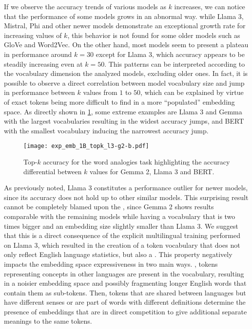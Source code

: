 If we observe the accuracy trends of various models as $k$ increases, we can notice that the performance of some models grows in an abnormal way.
 while Llama 3, Mistral, Phi and other newer models demonstrate an exceptional growth rate for increasing values of $k$, this behavior is not found for some older models such as GloVe and Word2Vec.
On the other hand, most models seem to present a plateau in performance around $k = 30$ except for Llama 3, which accuracy appears to be steadily increasing even at $k = 50$.
This patterns can be interpreted according to the vocabulary dimension the analyzed models, excluding older ones.
In fact, it is possible to observe a direct correlation between model vocabulary size and jump in performance between $k$ values from $1$ to $50$, which can be explained by virtue of exact tokens being more difficult to find in a more ``populated'' embedding space.
As directly shown in \cref{fig:exp_emb_1_B}, some extreme examples are Llama 3 and Gemma with the largest vocabularies resulting in the widest accuracy jumps, and BERT with the smallest vocabulary inducing the narrowest accuracy jump.

\begin{figure}[t!]
    \centering
    \texttt{[image: exp\_emb\_1B\_topk\_l3-g2-b.pdf]}
    \caption{Top-$k$ accuracy for the word analogies task highlighting the accuracy differential between $k$ values for Gemma 2, Llama 3 and BERT.}
    \label{fig:exp_emb_1_B}
\end{figure}

As previously noted, Llama 3 constitutes a performance outlier for newer models, since its accuracy does not hold up to other similar models.
This surprising result cannot be completely blamed upon the , since Gemma 2 shows results comparable with the remaining models while having a vocabulary that is two times bigger and an embedding size slightly smaller than Llama 3.
We suggest that this is a direct consequence of the explicit multilingual training performed on Llama 3, which resulted in the creation of a token vocabulary that does not only reflect English language statistics, but also a .
This property negatively impacts the embedding space expressiveness in two main ways.
, tokens representing concepts in other languages are present in the vocabulary, resulting in a noisier embedding space and possibly fragmenting longer English words that contain them as sub-tokens.
Then, tokens that are shared between languages but have different senses or are part of words with different definitions determine the presence of embeddings that are in direct competition to give additional separate meanings to the same tokens.

